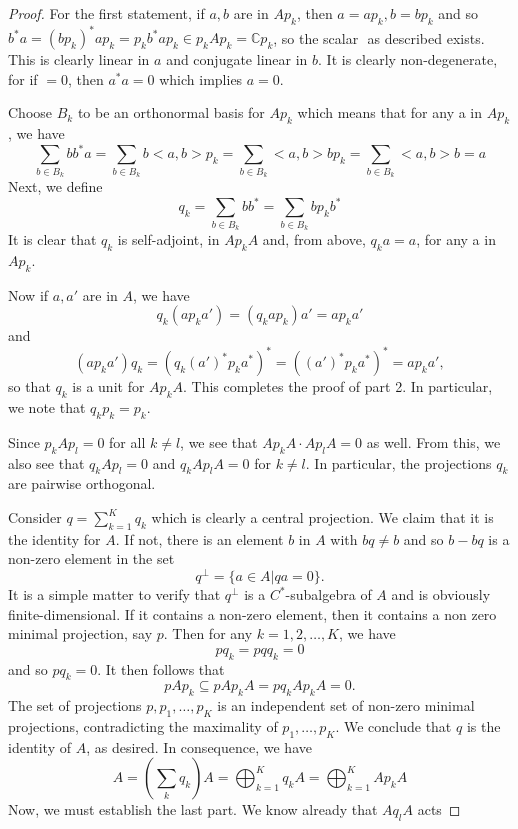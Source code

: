 \documentclass{book}
\begin{document}
\begin{proof}
  For the first statement, if \(a,b\) are in \(Ap_k\), then \(a = ap_k,b = bp_k\) and
  so \(b^*a = {(bp_k)}^*ap_k = p_k b^*ap_k \in p_k Ap_k = \mathbb{C}p_k\), so the scalar \(< a,b >\) as
  described exists. This is clearly linear in \(a\) and conjugate linear in \(b\). It is
  clearly non-degenerate, for if \(< a,a >= 0\), then \(a^*a = 0\) which implies \(a = 0\).\par
  Choose \(B_k\) to be an orthonormal basis for \(Ap_k\) which means that for any
  a in \(Ap_k\), we have
  \[
  \sum_{b\in B_k}bb^*a =\sum_{b\in B_k}b <a,b > p_k = \sum_{b\in B_k}<a,b > b p_k=\sum_{b\in B_k}<a,b > b=a
  \]
  Next, we define
  \[
  q_k=\sum_{b\in B_k}bb^*=\sum_{b\in B_k}bp_k b^*
  \]
  It is clear that \(q_k\) is self-adjoint, in \(Ap_k A\) and, from above, \(q_k a = a\), for any
  a in \(Ap_k\).\par
  Now if \(a,a'\) are in \(A\), we have
  \[
  q_k (ap_k a') = (q_k ap_k)a'= ap_k a'
  \]
  and
  \[
  (ap_k a')q_k = {(q_k {(a')}^*p_k a^*)}^* = {({(a')}^* p_k a^*)}^* = ap_k a',
  \]
  so that \(q_k\) is a unit for \(Ap_k A\). This completes the proof of part 2. In particular,
  we note that \(q_k p_k = p_k\).\par
  Since \(p_k Ap_l = 0\) for all \(k\neq l\), we see that \(Ap_k A\cdot Ap_l A = 0\) as well. From
  this, we also see that \(q_k Ap_l = 0\) and \(q_k Ap_l A = 0\) for \(k\neq l\). In particular, the
  projections \(q_k\) are pairwise orthogonal.\par
  Consider \(q = \sum^K_{k=1} q_k\)
  which is clearly a central projection. We claim
  that it is the identity for \(A\). If not, there is an element \(b\) in \(A\) with \(bq\ne b\)
  and so \(b- bq\) is a non-zero element in the set
  \[
    q^{\perp } =\{a \in A|qa=0\}.
  \]
  It is a simple matter to verify that \(q^\perp\) is a \(C^*\)-subalgebra of \(A\) and is obviously
  finite-dimensional. If it contains a non-zero element, then it contains a non
  zero minimal projection, say \(p\). Then for any \(k = 1,2,\ldots,K\), we have
  \[pq_k=pqq_k=0\]
  and so \(pq_k = 0\). It then follows that
  \[pAp_k \subseteq pAp_k A = pq_k Ap_k A = 0.\]
  The set of projections \(p,p_1,\ldots,p_K\) is an independent set of non-zero minimal
  projections, contradicting the maximality of \(p_1,\ldots,p_K\). We conclude that \(q\)
  is the identity of \(A\), as desired. In consequence, we have
  \[
  A= \left( \sum_k q_k \right)A = \bigoplus_{k=1}^K q_k A =\bigoplus_{k=1}^K Ap_k A
  \]
  Now, we must establish the last part. We know already that \(Aq_l A\) acts

\end{proof}
\end{document}
